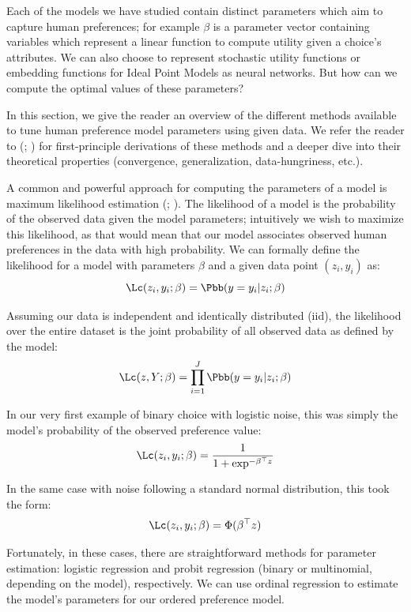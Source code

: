 \documentclass[
  letterpaper,
  DIV=11,
  numbers=noendperiod,
  oneside]{scrreprt}
\theoremstyle{remark}
\begin{document}
Each of the models we have studied contain distinct parameters which aim
to capture human preferences; for example \(\beta\) is a parameter
vector containing variables which represent a linear function to compute
utility given a choice's attributes. We can also choose to represent
stochastic utility functions or embedding functions for Ideal Point
Models as neural networks. But how can we compute the optimal values of
these parameters?

In this section, we give the reader an overview of the different methods
available to tune human preference model parameters using given data. We
refer the reader to (; ) for
first-principle derivations of these methods and a deeper dive into
their theoretical properties (convergence, generalization,
data-hungriness, etc.).

A common and powerful approach for computing the parameters of a model
is maximum likelihood estimation
(;
). The likelihood
of a model is the probability of the observed data given the model
parameters; intuitively we wish to maximize this likelihood, as that
would mean that our model associates observed human preferences in the
data with high probability. We can formally define the likelihood for a
model with parameters \(\beta\) and a given data point \((z_i, y_i)\)
as: \[\Lc(z_i, y_i; \beta) = \Pbb(y = y_i | z_i; \beta)\]

Assuming our data is independent and identically distributed (iid), the
likelihood over the entire dataset is the joint probability of all
observed data as defined by the model:
\[\Lc(z, Y; \beta) = \prod_{i = 1}^J \Pbb(y = y_i | z_i; \beta)\]

In our very first example of binary choice with logistic noise, this was
simply the model's probability of the observed preference value:
\[\Lc(z_i, y_i; \beta) = \frac{1}{1 + \exp^{-\beta^\top z}}\]

In the same case with noise following a standard normal distribution,
this took the form: \[\Lc(z_i, y_i; \beta) = \Phi(\beta^\top z)\]

Fortunately, in these cases, there are straightforward methods for
parameter estimation: logistic regression and probit regression (binary
or multinomial, depending on the model), respectively. We can use
ordinal regression to estimate the model's parameters for our ordered
preference model.
\end{document}
